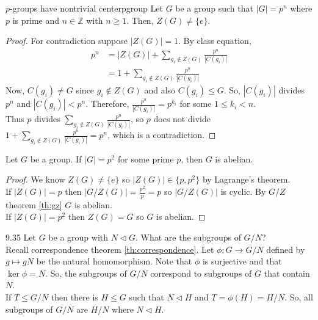 \documentclass[12pt]{article}
\newcommand{\Z}{\mathbb{Z}}
\begin{document}
	\begin{mythm}{$p$-groups have nontrivial center}{pgroup}
		Let $G$ be a group such that $|G|=p^n$ where $p$ is prime and $n\in\Z$ with $n\geq1$. Then, $Z(G)\neq\{e\}$.
		\begin{proof}
			For contradiction suppose $|Z(G)|=1$. By class equation,
			\begin{align*}
				p^n&=|Z(G)|+\sum_{g_i\notin Z(G)}\frac{p^n}{|C(g_i)|}\\
				&=1+\sum_{g_i\notin Z(G)}\frac{p^n}{|C(g_i)|}
			\end{align*}
			Now, $C(g_i)\neq G$ since $g_i\notin Z(G)$ and also $C(g_i)\leq G$. So, $|C(g_i)|$ divides $p^n$ and $|C(g_i)|<p^n$. Therefore, $\frac{p^n}{|C(g_i)|}=p^{k_i}$ for some $1\leq k_i<n$.\\
			
			Thus $p$ divides $\sum_{g_i\notin Z(G)}\frac{p^n}{|C(g_i)|}$, so $p$ does not divide $1+\sum_{g_i\notin Z(G)}\frac{p^n}{|C(g_i)|}=p^n$, which is a contradiction.
		\end{proof}
	\end{mythm}
	
	\begin{mycor}{}{}
		Let $G$ be a group. If $|G|=p^2$ for some prime $p$, then $G$ is abelian.
		\begin{proof}
			We know $Z(G)\neq\{e\}$ so $|Z(G)|\in\{p, p^2\}$ by Lagrange's theorem.\\
			
			If $|Z(G)|=p$ then $|G/Z(G)|=\frac{p^2}{p}=p$ so $|G/Z(G)|$ is cyclic. By $G/Z$ theorem \ref{th:gz} $G$ is abelian.\\
			
			If $|Z(G)|=p^2$ then $Z(G)=G$ so $G$ is abelian.
		\end{proof}
	\end{mycor}
	
	\begin{myrem}{}{9.35}
		Let $G$ be a group with $N\lhd G$. What are the subgroups of $G/N$?\\
		
		Recall correspondence theorem \ref{th:correspondence}. Let $\phi:G\to G/N$ defined by $g\mapsto gN$ be the natural homomorphism. Note that $\phi$ is surjective and that $\ker\phi=N$. So, the subgroups of $G/N$ correspond to subgroups of $G$ that contain $N$.\\
		
		If $T\leq G/N$ then there is $H\leq G$ such that $N\lhd H$ and $T=\phi(H)=H/N$. So, all subgroups of $G/N$ are $H/N$ where $N\lhd H$.
	\end{myrem}
	
\end{document}
